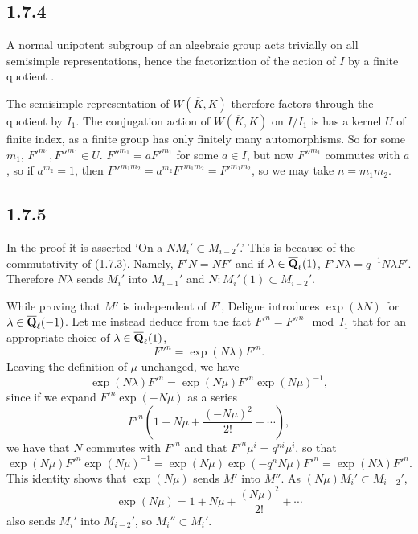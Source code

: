 \documentclass[deligne.tex]{subfiles}
\begin{document}
\subsection*{1.7.4} A normal unipotent subgroup of an algebraic group
acts trivially on all semisimple representations, hence the factorization
of the action of $I$ by a finite quotient \cite[19.16]{Milne}.

The semisimple representation of $W(\overline K,K)$ therefore factors
through the quotient by $I_1$. The conjugation action of $W(\overline K,K)$
on $I/I_1$ is has a kernel $U$ of finite index, as a finite group 
has only finitely many automorphisms. So for some $m_1$,
$F'^{m_1},F''^{m_1}\in U$. $F''^{m_1}=aF'^{m_1}$ for some $a\in I$, but now
$F''^{m_1}$ commutes with $a$, so if $a^{m_2}=1$, then
$F''^{m_1m_2}=a^{m_2}F'^{m_1m_2}=F'^{m_1m_2}$, so we may take $n=m_1m_2$.

\subsection*{1.7.5}
In the proof it is asserted `On a $NM_i'\subset M_{i-2}'$.' This is because
of the commutativity of (1.7.3). Namely, $F'N=NF'$ and if
$\lambda\in\overline{\mathbf{Q}}_\ell(1)$, $F'N\lambda=q^{-1}N\lambda F'$.
Therefore $N\lambda$ sends $M_i'$ into $M_{i-1}'$ and
$N:M_i'(1)\subset M_{i-2}'$.

While proving that $M'$ is independent of $F'$, Deligne introduces
$\exp(\lambda N)$ for $\lambda\in\overline{\mathbf{Q}}_\ell(-1)$. Let me instead
deduce from the fact $F'^n=F''^n\mod I_1$ that for an appropriate choice of
$\lambda\in\overline{\mathbf{Q}}_\ell(1)$,
\begin{equation*}
	F''^n=\exp(N\lambda)F'^n.
\end{equation*}
Leaving the definition of $\mu$ unchanged, we have
\begin{equation*}
	\exp(N\lambda)F'^n	= \exp(N\mu)F'^n\exp(N\mu)^{-1},
\end{equation*}
since if we expand $F'^n\exp(-N\mu)$ as a series
\begin{equation*}
	F'^n\left(1-N\mu+\frac{(-N\mu)^2}{2!}+\cdots\right),
\end{equation*}
we have that $N$ commutes with $F'^n$ and that
$F'^n\mu^i=q^{ni}\mu^i$, so that
\begin{equation*}
	\exp(N\mu)F'^n\exp(N\mu)^{-1} =
	\exp(N\mu)\exp(-q^nN\mu)F'^n =
	\exp(N\lambda)F'^n.
\end{equation*}
This identity shows that $\exp(N\mu)$ sends $M'$ into $M''$.
As $(N\mu)M_i'\subset M_{i-2}'$,
\begin{equation*}
	\exp(N\mu)=1+N\mu+\frac{(N\mu)^2}{2!}+\cdots
\end{equation*}
also sends $M_i'$ into $M_{i-2}'$, so $M_i''\subset M_i'$.
\end{document}
